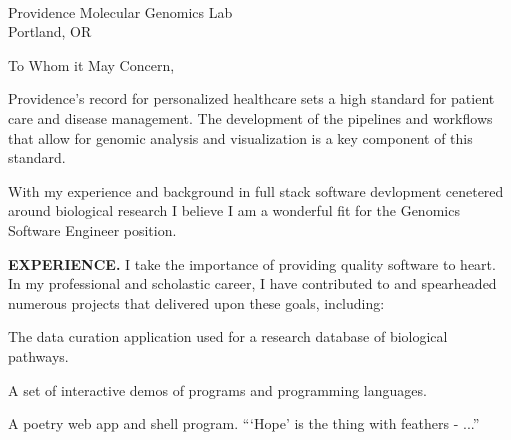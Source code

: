 



\textcolor{my-grey}{\dotfill}
\bigbreak

{\DTMtoday}\\
Providence Molecular Genomics Lab\\
Portland, OR

\vspace*{2\baselineskip}

To Whom it May Concern,

\vspace*{2\baselineskip}

Providence's record for personalized healthcare sets a high standard for patient care and disease management. The development of the pipelines and workflows that allow for genomic analysis and visualization is a key component of this standard.

\vspace*{\baselineskip}

With my experience and background in full stack software devlopment cenetered around biological research I believe I am a wonderful fit for the Genomics Software Engineer position.

\vspace*{\baselineskip}

\textbf{EXPERIENCE.} I take the importance of providing quality software to heart. In my professional and scholastic career, I have contributed to and spearheaded numerous projects that delivered upon these goals, including:

\begin{itemize}[label=$\triangleright$]
The data curation application used for a research database of biological pathways.

A set of interactive demos of programs and programming languages.

A poetry web app and shell program. ```Hope' is the thing with feathers - ...''

\end{itemize}

\vspace*{\baselineskip}

